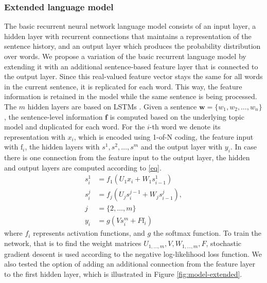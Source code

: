 \documentclass[a4paper]{article}
\begin{document}
\subsubsection{Extended language model}
The basic recurrent neural network language model consists of an input layer, a hidden layer with recurrent connections that maintains a representation of the sentence history, and an output layer which produces the probability distribution over words.
We propose a variation of the basic recurrent language model by extending it with an additional sentence-based feature layer that is connected to the output layer. Since this real-valued feature vector stays the same for all words in the current sentence, it is replicated for each word. This way, the feature information is retained in the model while the same sentence is being processed.
The $m$ hidden layers are based on LSTMs \cite{hochreiter1997long}.
Given a sentence $\textbf{w} = \{w_1, w_2, \ldots, w_n\}$, the sentence-level information $\textbf{f}$ is computed based on the underlying topic model and duplicated for each word. For the $i$-th word we denote its representation with $x_i$, which is encoded using 1-of-N coding, the feature input with $\text{f}_i$, the hidden layers with $s^1, s^2, \dots, s^m$ and the output layer with $y_i$. In case there is one connection from the feature input to the output layer, the hidden and output layers are computed according to \eqref{eq}.
\begin{equation}
\label{eq}
\begin{aligned}
s^1_i &= f_1(U_1x_i + W_1s^1_{i-1}) \\
s^j_i &= f_j(U_js^{j-1}_i + W_js^j_{i-1}), \\j &= \{2,\ldots,m\} \\
y_i &= g(Vs^m_i + F\text{f}_i)
\end{aligned}
\end{equation}
where $f_i$ represents activation functions, and $g$ the softmax function.
To train the network, that is to find the weight matrices $U_{1,\dots,m}, V, W_{1,\dots,m}, F$, stochastic gradient descent is used according to the negative log-likelihood loss function. We also tested the option of adding an additional connection from the feature layer to the first hidden layer, which is illustrated in Figure \ref{fig:model-extended}.
\end{document}
